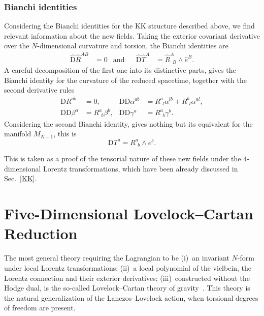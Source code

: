 \documentclass[aps,prd,12pt,superscriptaddress,showpacs,showkeys,longbibliography,reprint,nofootinbib]{revtex4-1}
\begin{document}
\subsubsection{Bianchi identities}

Considering the Bianchi identities for the KK structure described above, we find relevant information about the new fields. Taking the exterior covariant derivative over the $N$-dimensional curvature and torsion, the Bianchi identities are
\begin{align*}
  \hat{\text{D}}\hat{R}^{AB} &= 0 &\mbox{and}& &\hat{\text{D}}\hat{T}^A &= \hat{R}^A_{\ \ B}\wedge\hat{e}^B.
\end{align*}
A careful decomposition of the first one into its distinctive parts, gives the Bianchi identity for the curvature of the reduced spacetime, together with the second derivative rules
\begin{align*}
  \text{D}R^{ab} &=0, & \text{D}\mbox{D}\alpha^{ab} &=R^a_{\ \ l}\alpha^{lb}+R^b_{\ \ l}\alpha^{al},\\
  \text{D}\text{D}\beta^a &= R^a_{\ \ b}\beta^{b}, & \text{D}\text{D}\gamma^a &= R^a_{\ \ b}\gamma^{b}.
\end{align*}
Considering the second Bianchi identity, gives nothing but its equivalent for the manifold $M_{N-1}$, this is
\begin{equation*}
  \mbox{D}T^a=R^a_{\ \ b}\wedge e^b.
\end{equation*}

This is taken as a proof of the tensorial nature of these new fields under the $4$-dimensional Lorentz transformations, which have been already discussed in Sec.~\ref{KK}.

\section{Five-Dimensional Lovelock--Cartan Reduction\label{5EGB}}

The most general theory requiring the Lagrangian to be (i)~an invariant $N$-form under local Lorentz transformations; (ii)~a local polynomial of the vielbein, the Lorentz connection and their exterior derivatives; (iii)~constructed without the Hodge dual, is the so-called Lovelock--Cartan theory of gravity~\cite{Mardones:1990qc}. This theory is the natural generalization of the Lanczos--Lovelock action, when torsional degrees of freedom are present. 
\end{document}
